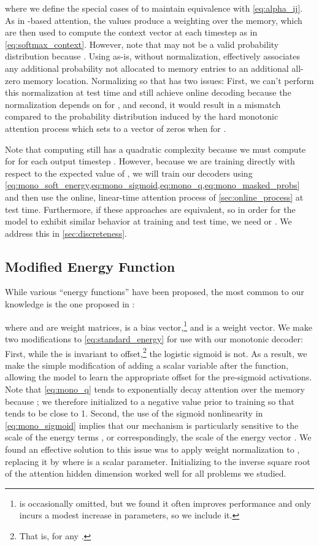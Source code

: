 \documentclass{article}
\begin{document}
where we define the special cases of  to maintain equivalence with \cref{eq:alpha_ij}.
As in -based attention, the  values produce a weighting over the memory, which are then used to compute the context vector at each timestep as in \cref{eq:softmax_context}.
However, note that  may not be a valid probability distribution because .
Using  as-is, without normalization, effectively associates any additional probability not allocated to memory entries to an additional all-zero memory location.
Normalizing  so that  has two issues: First, we can't perform this normalization at test time and still achieve online decoding because the normalization depends on  for , and second, it would result in a mismatch compared to the probability distribution induced by the hard monotonic attention process which sets  to a vector of zeros when  for .

Note that computing  still has a quadratic complexity because we must compute  for  for each output timestep .
However, because we are training directly with respect to the expected value of , we will train our decoders using \cref{eq:mono_soft_energy,eq:mono_sigmoid,eq:mono_q,eq:mono_masked_probs} and then use the online, linear-time attention process of \cref{sec:online_process} at test time.
Furthermore, if  these approaches are equivalent, so in order for the model to exhibit similar behavior at training and test time, we need  or .
We address this in \cref{sec:discreteness}.

\subsection{Modified Energy Function}
\label{sec:energy}

While various ``energy functions''  have been proposed, the most common to our knowledge is the one proposed in :

where  and  are weight matrices,  is a bias vector,\footnote{ is occasionally omitted, but we found it often improves performance and only incurs a modest increase in parameters, so we include it.} and  is a weight vector.
We make two modifications to \cref{eq:standard_energy} for use with our monotonic decoder:
First, while the  is invariant to offset,\footnote{That is,  for any .} the logistic sigmoid is not.
As a result, we make the simple modification of adding a scalar variable  after the  function, allowing the model to learn the appropriate offset for the pre-sigmoid activations.
Note that \cref{eq:mono_q} tends to exponentially decay attention over the memory because ; we therefore initialized  to a negative value prior to training so that  tends to be close to 1.
Second, the use of the sigmoid nonlinearity in \cref{eq:mono_sigmoid} implies that our mechanism is particularly sensitive to the scale of the energy terms , or correspondingly, the scale of the energy vector .
We found an effective solution to this issue was to apply weight normalization  to , replacing it by  where  is a scalar parameter.
Initializing  to the inverse square root of the attention hidden dimension worked well for all problems we studied.
\end{document}
